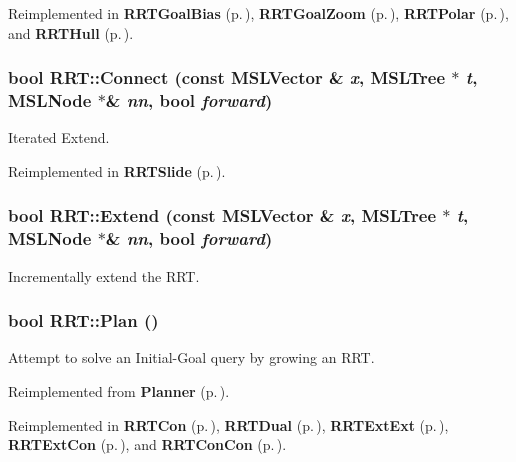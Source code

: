 Reimplemented in {\bf RRTGoal\-Bias} {\rm (p.\,\pageref{class_RRTGoalBias_b0})}, {\bf RRTGoal\-Zoom} {\rm (p.\,\pageref{class_RRTGoalZoom_b0})}, {\bf RRTPolar} {\rm (p.\,\pageref{class_RRTPolar_b0})}, and {\bf RRTHull} {\rm (p.\,\pageref{class_RRTHull_b0})}.
\subsubsection{\setlength{\rightskip}{0pt plus 5cm}bool RRT::Connect (const {\bf MSLVector} \& {\em x}, {\bf MSLTree} $\ast$ {\em t}, {\bf MSLNode} $\ast$\& {\em nn}, bool {\em forward})\hspace{0.3cm}{\tt  [protected, virtual]}}\label{class_RRT_b3}


Iterated Extend.



Reimplemented in {\bf RRTSlide} {\rm (p.\,\pageref{class_RRTSlide_a3})}.
\subsubsection{\setlength{\rightskip}{0pt plus 5cm}bool RRT::Extend (const {\bf MSLVector} \& {\em x}, {\bf MSLTree} $\ast$ {\em t}, {\bf MSLNode} $\ast$\& {\em nn}, bool {\em forward})\hspace{0.3cm}{\tt  [protected, virtual]}}\label{class_RRT_b2}


Incrementally extend the RRT.

\subsubsection{\setlength{\rightskip}{0pt plus 5cm}bool RRT::Plan ()\hspace{0.3cm}{\tt  [virtual]}}\label{class_RRT_a3}


Attempt to solve an Initial-Goal query by growing an RRT.



Reimplemented from {\bf Planner} {\rm (p.\,\pageref{class_Planner_a4})}.

Reimplemented in {\bf RRTCon} {\rm (p.\,\pageref{class_RRTCon_a2})}, {\bf RRTDual} {\rm (p.\,\pageref{class_RRTDual_a2})}, {\bf RRTExt\-Ext} {\rm (p.\,\pageref{class_RRTExtExt_a2})}, {\bf RRTExt\-Con} {\rm (p.\,\pageref{class_RRTExtCon_a2})}, and {\bf RRTCon\-Con} {\rm (p.\,\pageref{class_RRTConCon_a2})}.
